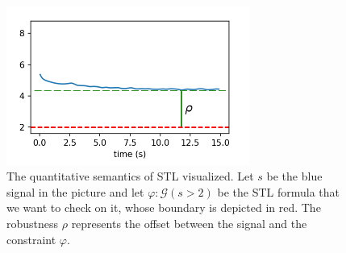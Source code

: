 \begin{figure}[H]
	\centering
	\includegraphics[width=8cm, keepaspectratio]{img/2_3_stl_robustness.png}
	\caption{The quantitative semantics of STL visualized. Let $s$ be the blue signal in the picture and let $\varphi: \mathcal{G}(s > 2)$ be the STL formula that we want to check on it, whose boundary is depicted in red. The robustness $\rho$ represents the offset between the signal and the constraint $\varphi$.}
\end{figure}